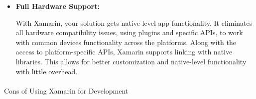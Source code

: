 \begin{itemize}
 \item \textbf{Full Hardware Support: }

 With Xamarin, your solution gets native-level app functionality. It eliminates all hardware compatibility issues, using plugins and specific APIs, to work with common devices functionality across the platforms. Along with the access to platform-specific APIs, Xamarin supports linking with native libraries. This allows for better customization and native-level functionality with little overhead.


\end{itemize}

\paragraph{}
Cons of Using Xamarin for Development

